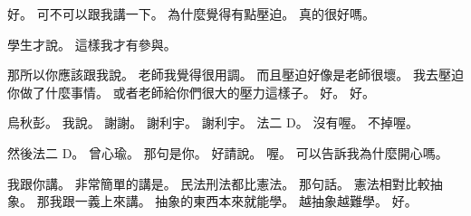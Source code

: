 \hypertarget{c01:cue:2458}{}好。
\hypertarget{c01:cue:2459}{}可不可以跟我講一下。
\hypertarget{c01:cue:2460}{}為什麼覺得有點壓迫。
\hypertarget{c01:cue:2461}{}真的很好嗎。

\hypertarget{c01:cue:2462}{}學生才說。
\hypertarget{c01:cue:2463}{}這樣我才有參與。

\hypertarget{c01:cue:2464}{}那所以你應該跟我說。
\hypertarget{c01:cue:2465}{}老師我覺得很用調。
\hypertarget{c01:cue:2466}{}而且壓迫好像是老師很壞。
\hypertarget{c01:cue:2467}{}我去壓迫你做了什麼事情。
\hypertarget{c01:cue:2468}{}或者老師給你們很大的壓力這樣子。
\hypertarget{c01:cue:2469}{}好。
\hypertarget{c01:cue:2470}{}好。

\hypertarget{c01:cue:2471}{}烏秋彭。
\hypertarget{c01:cue:2472}{}我說。
\hypertarget{c01:cue:2473}{}謝謝。
\hypertarget{c01:cue:2474}{}謝利宇。
\hypertarget{c01:cue:2475}{}謝利宇。
\hypertarget{c01:cue:2476}{}法二 D。
\hypertarget{c01:cue:2477}{}沒有喔。
\hypertarget{c01:cue:2478}{}不掉喔。

\hypertarget{c01:cue:2479}{}然後法二 D。
\hypertarget{c01:cue:2480}{}曾心瑜。
\hypertarget{c01:cue:2481}{}那句是你。
\hypertarget{c01:cue:2482}{}好請說。
\hypertarget{c01:cue:2483}{}喔。
\hypertarget{c01:cue:2484}{}可以告訴我為什麼開心嗎。

\hypertarget{c01:cue:2485}{}我跟你講。
\hypertarget{c01:cue:2486}{}非常簡單的講是。
\hypertarget{c01:cue:2487}{}民法刑法都比憲法。
\hypertarget{c01:cue:2488}{}那句話。
\hypertarget{c01:cue:2489}{}憲法相對比較抽象。
\hypertarget{c01:cue:2490}{}那我跟一義上來講。
\hypertarget{c01:cue:2491}{}抽象的東西本來就能學。
\hypertarget{c01:cue:2492}{}越抽象越難學。
\hypertarget{c01:cue:2493}{}好。

